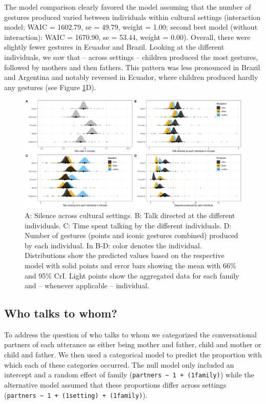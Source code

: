 \documentclass[
  man,floatsintext]{apa6}
\begin{document}
The model comparison clearly favored the model assuming that the number of gestures produced varied between individuals within cultural settings (interaction model; WAIC = 1602.79, se = 49.79, weight = 1.00; second best model (without interaction): WAIC = 1670.90, se = 53.44, weight = 0.00). Overall, there were slightly fewer gestures in Ecuador and Brazil. Looking at the different individuals, we saw that -- across settings -- children produced the most gestures, followed by mothers and then fathers. This pattern was less pronounced in Brazil and Argentina and notably reversed in Ecuador, where children produced hardly any gestures (see Figure \ref{fig:fig1}D).

\begin{figure}
\includegraphics[width=1\linewidth]{../visuals/fig1} \caption{A: Silence across cultural settings. B: Talk directed at the different individuals. C: Time spent talking by the different individuals. D: Number of gestures (points and iconic gestures combined) produced by each individual. In B-D: color denotes the individual. Distributions show the predicted values based on the respective model with solid points and error bars showing the mean with 66\% and 95\% CrI. Light points show the aggregated data for each family and -- whenever applicable -- individual.}\label{fig:fig1}
\end{figure}

\hypertarget{who-talks-to-whom}{%
\subsection{Who talks to whom?}\label{who-talks-to-whom}}

To address the question of who talks to whom we categorized the conversational partners of each utterance as either being mother and father, child and mother or child and father. We then used a categorical model to predict the proportion with which each of these categories occurred. The null model only included an intercept and a random effect of family (\texttt{partners\ \textasciitilde{}\ 1\ +\ (1\textbar{}family)}) while the alternative model assumed that these proportions differ across settings (\texttt{partners\ \textasciitilde{}\ 1\ +\ (1\textbar{}setting)\ +\ (1\textbar{}family)}).
\end{document}
